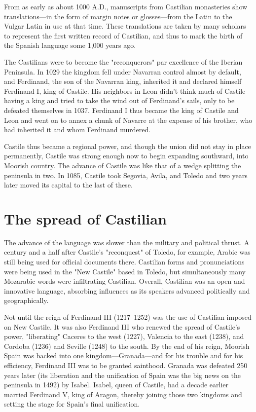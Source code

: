 From as early as about 1000 A.D., manuscripts from Castilian
monasteries show translations---in the form of margin notes or glosses---from the Latin to the Vulgar Latin in use at that time. These translations are taken by many scholars to represent the first written record
of Castilian, and thus to mark the birth of the Spanish language some
1,000 years ago.

The Castilians were to become the "reconquerors" par excellence of the Iberian Peninsula. In 1029 the kingdom fell under Navarran control almost by default, and Ferdinand, the son of the Navarran
king, inherited it and declared himself Ferdinand I, king of Castile. His
neighbors in Leon didn't think much of Castile having a king and tried
to take the wind out of Ferdinand's sails, only to be defeated themselves in 1037. Ferdinand I thus became the king of Castile and Leon
and went on to annex a chunk of Navarre at the expense of his brother,
who had inherited it and whom Ferdinand murdered.

Castile thus became a regional power, and though the union
did not stay in place permanently, Castile was strong enough now
to begin expanding southward, into Moorish country. The advance
of Castile was like that of a wedge splitting the peninsula in two.
In 1085, Castile took Segovia, Avila, and Toledo and two years later
moved its capital to the last of these.

\section{The spread of Castilian}

The advance of the language was slower than the military and
political thrust. A century and a half after Castile's "reconquest" of Toledo, for example, Arabic was still being used for official documents
there. Castilian forms and pronunciations were being used in the "New
Castile" based in Toledo, but simultaneously many Mozarabic words
were infiltrating Castilian. Overall, Castilian was an open and innovative language, absorbing influences as its speakers advanced politically
and geographically.

Not until the reign of Ferdinand III (1217--1252) was the use
of Castilian imposed on New Castile. It was also Ferdinand III who renewed the spread of Castile's power, "liberating" Caceres to the west
(1227), Valencia to the east (1238), and Cordoba (1236) and Seville
(1248) to the south. By the end of his reign, Moorish Spain was backed
into one kingdom---Granada---and for his trouble and for his efficiency,
Ferdinand III was to be granted sainthood. Granada was defeated 250
years later (its liberation and the unification of Spain was the big news
on the peninsula in 1492) by Isabel. Isabel, queen of Castile, had a decade earlier married Ferdinand V, king of Aragon, thereby joining those
two kingdoms and setting the stage for Spain's final unification.

